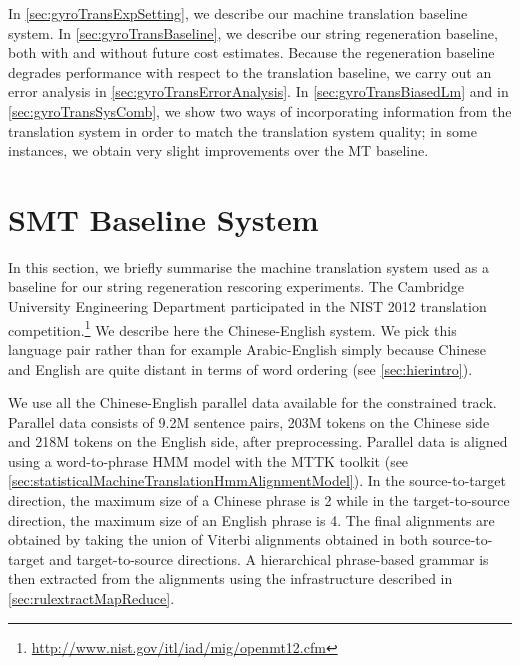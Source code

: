 In \autoref{sec:gyroTransExpSetting}, we describe
our machine translation baseline system.
In \autoref{sec:gyroTransBaseline}, we describe
our string regeneration baseline, both with and without
future cost estimates. Because the regeneration baseline
degrades performance with respect to the translation
baseline, we carry out an error analysis
in \autoref{sec:gyroTransErrorAnalysis}.
In \autoref{sec:gyroTransBiasedLm} and
in \autoref{sec:gyroTransSysComb}, we show two ways of incorporating
information from the translation system in order to match
the translation system quality; in some instances,
we obtain very slight improvements over the MT baseline.

\section{SMT Baseline System}
\label{sec:gyroTransExpSetting}

In this section, we briefly summarise the machine translation
system used as a baseline for our string regeneration rescoring
experiments.
%
%
The Cambridge University Engineering Department participated in the
NIST 2012 translation
competition.\footnote{\url{http://www.nist.gov/itl/iad/mig/openmt12.cfm}}
We describe here the Chinese-English system. We pick this language
pair rather than for example Arabic-English simply because Chinese
and English are quite distant in terms of word ordering (see \autoref{sec:hierintro}).

We use all the Chinese-English parallel data
available for the constrained track. Parallel data consists
of 9.2M sentence pairs, 203M tokens on the Chinese side and
218M tokens on the English side, after preprocessing.
Parallel data is aligned using a word-to-phrase
HMM model with the MTTK
toolkit (see \autoref{sec:statisticalMachineTranslationHmmAlignmentModel}).
In the source-to-target direction, the maximum size of a Chinese phrase is 2 while
in the target-to-source direction, the maximum size of an English phrase is 4. %
The final alignments are obtained by taking
the union of Viterbi alignments obtained
in both source-to-target and target-to-source directions.
A hierarchical phrase-based grammar is then extracted from
the alignments using the infrastructure described
in \autoref{sec:rulextractMapReduce}.

